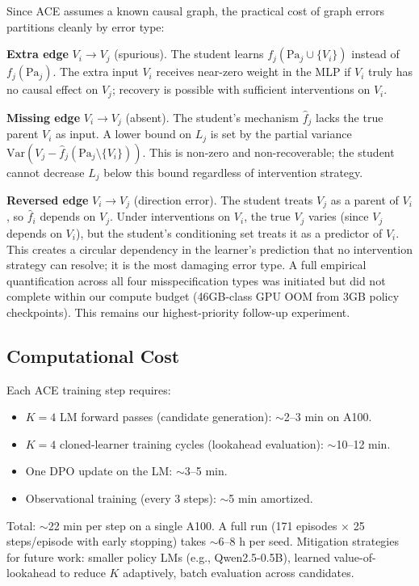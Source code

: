 \documentclass[twoside]{article}
\theoremstyle{plain}
\theoremstyle{definition}
\theoremstyle{remark}
\begin{document}
Since ACE assumes a known causal graph, the practical cost of graph errors partitions cleanly by error type:

\textbf{Extra edge} $V_i \to V_j$ (spurious). The student learns $f_j(\text{Pa}_j \cup \{V_i\})$ instead of $f_j(\text{Pa}_j)$. The extra input $V_i$ receives near-zero weight in the MLP if $V_i$ truly has no causal effect on $V_j$; recovery is possible with sufficient interventions on $V_i$.

\textbf{Missing edge} $V_i \to V_j$ (absent). The student's mechanism $\hat{f}_j$ lacks the true parent $V_i$ as input. A lower bound on $L_j$ is set by the partial variance $\text{Var}(V_j - \hat{f}_j(\text{Pa}_j \setminus \{V_i\}))$. This is non-zero and non-recoverable; the student cannot decrease $L_j$ below this bound regardless of intervention strategy.

\textbf{Reversed edge} $V_i \to V_j$ (direction error). The student treats $V_j$ as a parent of $V_i$, so $\hat{f}_i$ depends on $V_j$. Under interventions on $V_i$, the true $V_j$ varies (since $V_j$ depends on $V_i$), but the student's conditioning set treats it as a predictor of $V_i$. This creates a circular dependency in the learner's prediction that no intervention strategy can resolve; it is the most damaging error type. A full empirical quantification across all four misspecification types was initiated but did not complete within our compute budget (46GB-class GPU OOM from 3GB policy checkpoints). This remains our highest-priority follow-up experiment.

\subsection{Computational Cost}
\label{app:compute}

Each ACE training step requires:
\begin{itemize}[leftmargin=1.2em,topsep=0.2em,itemsep=0.1em]
\item $K=4$ LM forward passes (candidate generation): $\sim$2--3 min on A100.
\item $K=4$ cloned-learner training cycles (lookahead evaluation): $\sim$10--12 min.
\item One DPO update on the LM: $\sim$3--5 min.
\item Observational training (every 3 steps): $\sim$5 min amortized.
\end{itemize}
Total: $\sim$22 min per step on a single A100. A full run (171 episodes $\times$ 25 steps/episode with early stopping) takes $\sim$6--8 h per seed. Mitigation strategies for future work: smaller policy LMs (e.g., Qwen2.5-0.5B), learned value-of-lookahead to reduce $K$ adaptively, batch evaluation across candidates.
\end{document}
